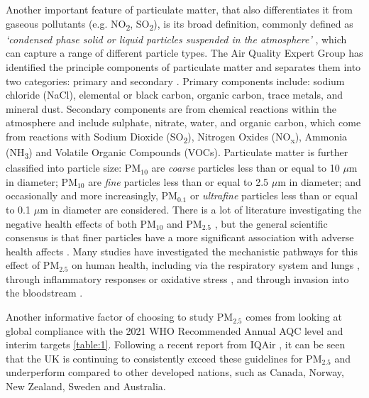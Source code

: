 Another important feature of particulate matter, that also differentiates it from gaseous pollutants (e.g. NO\textsubscript{2}, SO\textsubscript{2}), is its broad definition, commonly defined as \emph{`condensed phase solid or liquid particles suspended in the atmosphere'} \citep{AirQualityExpertGroup2012FineKingdom}, which can capture a range of different particle types. The Air Quality Expert Group has identified the principle components of particulate matter and separates them into two categories: primary and secondary \citep{AirQualityExpertGroup2005ParticulateSummary}. Primary components include: sodium chloride (NaCl), elemental or black carbon, organic carbon, trace metals, and mineral dust. Secondary components are from chemical reactions within the atmosphere and include sulphate, nitrate, water, and organic carbon, which come from reactions with Sodium Dioxide (SO\textsubscript{2}), Nitrogen Oxides (NO\textsubscript{x}), Ammonia (NH\textsubscript{3}) and Volatile Organic Compounds (VOCs). 
Particulate matter is further classified into particle size: PM$_{10}$ are \textit{coarse} particles less than or equal to 10 $\mu$m in diameter; PM$_{10}$ are \textit{fine} particles less than or equal to 2.5 $\mu$m in diameter; and occasionally and more increasingly, PM$_{0.1}$ or \textit{ultrafine} particles less than or equal to 0.1 $\mu$m in diameter are considered. There is a lot of literature investigating the negative health effects of both PM$_{10}$ and PM$_{2.5}$ \citep{Harrison2010SizeStudies}, but the general scientific consensus is that finer particles have a more significant association with adverse health affects \cite[p.9-13]{AirQualityExpertGroup2012FineKingdom}. Many studies have investigated the mechanistic pathways for this effect of PM$_{2.5}$ on human health, including via the respiratory system and lungs \citep{Pinkerton2000DistributionLung}, through inflammatory responses or oxidative stress \citep{Brook2008CardiovascularPollution}, and through invasion into the bloodstream \citep{Manisalidis2020EnvironmentalReview}.

Another informative factor of choosing to study PM$_{2.5}$ comes from looking at global compliance with the 2021 WHO Recommended Annual AQC level and interim targets \ref{table:1}. Following a recent report from IQAir \citep{IQAir2021WorldReport}, it can be seen that the UK is continuing to consistently exceed these guidelines for PM$_{2.5}$ and underperform compared to other developed nations, such as Canada, Norway, New Zealand, Sweden and Australia.

